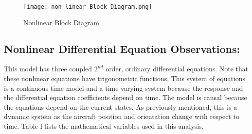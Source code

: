 \documentclass[conference]{IEEEtran}
\begin{document}
\begin{figure}[!h]
\centerline{\texttt{[image: non-linear\_Block\_Diagram.png]}}
\caption{Nonlinear Block Diagram}
\label{figure}
\end{figure}

\subsection{Nonlinear Differential Equation Observations:}
This model has three coupled $2^{nd}$ order, ordinary differential equations. Note that these nonlinear equations have trigonometric functions. This system of equations is a continuous time model and a time varying system because the response and the differential equation coefficients depend on time. The model is causal because the equations depend on the current states. As previously mentioned, this is a dynamic system as the aircraft position and orientation change with respect to time. Table I lists the mathematical variables used in this analysis.\\
\end{document}
